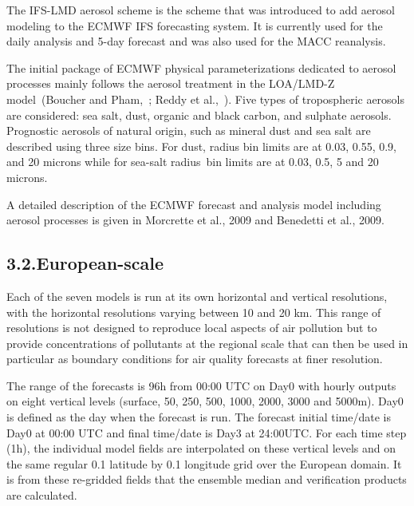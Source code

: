 \documentclass[9pt]{report}
\begin{document}
\noindent{}The IFS-LMD aerosol scheme is the scheme that was introduced to add aerosol modeling to the ECMWF IFS forecasting system. It is currently used for the daily analysis and 5-day forecast and was also used for the MACC reanalysis.%

The initial package of ECMWF physical parameterizations dedicated to aerosol processes mainly follows the aerosol treatment in the LOA/LMD-Z model~(Boucher and Pham,~; Reddy et al.,~). Five types of tropospheric aerosols are considered: sea salt, dust, organic and black carbon, and sulphate aerosols. Prognostic aerosols of natural origin, such as mineral dust and sea salt are described using three size bins. For dust, radius bin limits are at 0.03, 0.55, 0.9, and 20 microns while for sea-salt radius bin limits are at 0.03, 0.5, 5 and 20 microns.%

A detailed description of the ECMWF forecast and analysis model including aerosol processes is given in Morcrette et al., 2009 and Benedetti et al., 2009.%

\subsection{3.2.\hspace*{0.5em}European-scale}\label{sec-european-scale}%

\noindent{}Each of the seven models is run at its own horizontal and vertical resolutions, with the horizontal resolutions varying between 10 and 20 km.
This range of resolutions is not designed to reproduce local aspects of air pollution but to provide concentrations of pollutants at the regional scale that can then be used in particular as boundary conditions for air quality forecasts at finer resolution.%

The range of the forecasts is 96h from 00:00 UTC on Day0 with hourly outputs on eight vertical levels (surface, 50, 250, 500, 1000, 2000, 3000 and 5000m).
Day0 is defined as the day when the forecast is run.
The forecast initial time/date is Day0 at 00:00 UTC and final time/date is Day3 at 24:00UTC.
For each time step (1h), the individual model fields are interpolated on these vertical levels and on the same regular 0.1\textdegree{} latitude by 0.1\textdegree{} longitude grid over the European domain.
It is from these re-gridded fields that the ensemble median and verification products are calculated.%
\end{document}
